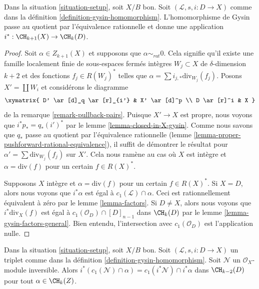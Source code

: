 \begin{lemma}
\label{lemma-gysin-factors}
Dans la situation \ref{situation-setup}, soit $X/B$ bon. Soit
$(\mathcal{L}, s, i : D \to X)$ comme dans la définition
\ref{definition-gysin-homomorphism}. L'homomorphisme de Gysin passe au quotient par
l'équivalence rationnelle et donne une application $i^* : \CH_{k + 1}(X) \to
\CH_k(D)$.
\end{lemma}

\begin{proof}
Soit $\alpha \in Z_{k + 1}(X)$ et supposons que $\alpha \sim_{rat} 0$. Cela
signifie qu'il existe une famille localement finie de sous-espaces fermés
intègres $W_j \subset X$ de $\delta$-dimension $k + 2$ et des fonctions
$f_j \in R(W_j)^*$ telles que $\alpha = \sum i_{j, *}\text{div}_{W_j}(f_j)$. Posons $X' =
\coprod W_i$ et considérons le diagramme
$$
\xymatrix{
D' \ar[d]_q \ar[r]_{i'} & X' \ar[d]^p \\
D \ar[r]^i & X
}
$$
de la remarque \ref{remark-pullback-pairs}. Puisque $X' \to X$ est propre,
nous voyons que $i^*p_* = q_*(i')^*$ par le lemme
\ref{lemma-closed-in-X-gysin}. Comme nous savons que $q_*$ passe au quotient par
l'équivalence rationnelle (lemme
\ref{lemma-proper-pushforward-rational-equivalence}), il suffit de démontrer le
résultat pour $\alpha' = \sum \text{div}_{W_j}(f_j)$ sur $X'$. Cela
nous ramène au cas où $X$ est intègre et $\alpha = \text{div}(f)$ pour
un certain $f \in R(X)^*$.

\medskip\noindent
Supposons $X$ intègre et $\alpha = \text{div}(f)$ pour
un certain $f \in R(X)^*$. Si $X = D$, alors nous voyons que $i^*\alpha$ est
égal à $c_1(\mathcal{L}) \cap \alpha$. Ceci est rationnellement équivalent à
zéro par le lemme \ref{lemma-factors}. Si $D \not = X$, alors nous voyons que
$i^*\text{div}_X(f)$ est égal à $c_1(\mathcal{O}_D) \cap [D]_{n - 1}$ dans
$\CH_k(D)$ par le lemme \ref{lemma-gysin-factors-general}. Bien entendu,
l'intersection avec $c_1(\mathcal{O}_D)$ est l'application nulle.
\end{proof}

\begin{lemma}
\label{lemma-gysin-commutes-cap-c1}
Dans la situation \ref{situation-setup}, soit $X/B$ bon. Soit
$(\mathcal{L}, s, i : D \to X)$ un triplet comme dans la définition
\ref{definition-gysin-homomorphism}. Soit $\mathcal{N}$ un
$\mathcal{O}_X$-module inversible. Alors $i^*(c_1(\mathcal{N}) \cap \alpha) =
c_1(i^*\mathcal{N}) \cap i^*\alpha$ dans $\CH_{k - 2}(D)$ pour tout
$\alpha \in \CH_k(Z)$.
\end{lemma}

